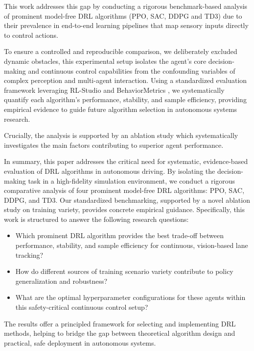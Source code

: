 \documentclass[]{interact}
\begin{document}
This work addresses this gap by conducting a rigorous benchmark-based analysis of prominent model-free DRL algorithms (PPO, SAC, DDPG and TD3) due to their prevalence in end-to-end learning pipelines that map sensory inputs directly to control actions. 

To ensure a controlled and reproducible comparison, we deliberately excluded dynamic obstacles, this experimental setup isolates the agent's core decision-making and continuous control capabilities from the confounding variables of complex perception and multi-agent interaction. 
Using a standardized evaluation framework leveraging RL-Studio and BehaviorMetrics \cite{paniego2024behaviormetrics}, we systematically quantify each algorithm's performance, stability, and sample efficiency, providing empirical evidence to guide future algorithm selection in autonomous systems research. 

Crucially, the analysis is supported by an ablation study which systematically investigates the main factors contributing to superior agent performance. 

In summary, this paper addresses the critical need for systematic, evidence-based evaluation of DRL algorithms in autonomous driving. By isolating the decision-making task in a high-fidelity simulation environment, we conduct a rigorous comparative analysis of four prominent model-free DRL algorithms: PPO, SAC, DDPG, and TD3. Our standardized benchmarking, supported by a novel ablation study on training variety, provides concrete empirical guidance. Specifically, this work is structured to answer the following research questions: 
\begin{itemize}
    \item [RQ1] Which prominent DRL algorithm provides the best trade-off between performance, stability, and sample efficiency for continuous, vision-based lane tracking?
    \item [RQ2] How do different sources of training scenario variety contribute to policy generalization and robustness?
    \item [RQ3] What are the optimal hyperparameter configurations for these agents within this safety-critical continuous control setup? 
\end{itemize}
The results offer a principled framework for selecting and implementing DRL methods, helping to bridge the gap between theoretical algorithm design and practical, safe deployment in autonomous systems.
\end{document}
